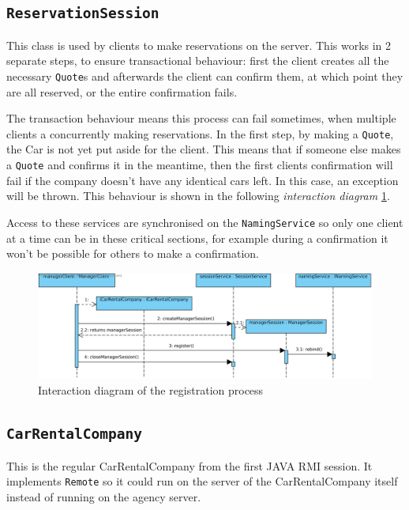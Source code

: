 \documentclass[a4paper]{article}
\begin{document}
\subsection{\texttt{ReservationSession}}
This class is used by clients to make reservations on the server. This works in 2 separate steps, to ensure transactional behaviour: first the client creates all the necessary \texttt{Quote}s and afterwards the client can confirm them, at which point they are all reserved, or the entire confirmation fails. 

The transaction behaviour means this process can fail sometimes, when multiple clients a concurrently making reservations. In the first step, by making a \texttt{Quote}, the Car is not yet put aside for the client. This means that if someone else makes a \texttt{Quote} and confirms it in the meantime, then the first clients confirmation will fail if the company doesn't have any identical cars left. In this case, an exception will be thrown. This behaviour is shown in the following  \emph{interaction diagram} \ref{fig:failed_confirmation_diagram}. 

Access to these services are synchronised on the \texttt{NamingService} so only one client at a time can be in these critical sections, for example during a confirmation it won't be possible for others to make a confirmation.
\begin{figure}[hbtp]
\centering
\includegraphics[width=\textwidth]{img/CarRentalCompany registration process.png}
\caption{Interaction diagram of the registration process}
\label{fig:failed_confirmation_diagram}
\end{figure}

\subsection{\texttt{CarRentalCompany}}
This is the regular CarRentalCompany from the first JAVA RMI session. It implements \texttt{Remote} so it could run on the server of the CarRentalCompany itself instead of running on the agency server. 
\end{document}
